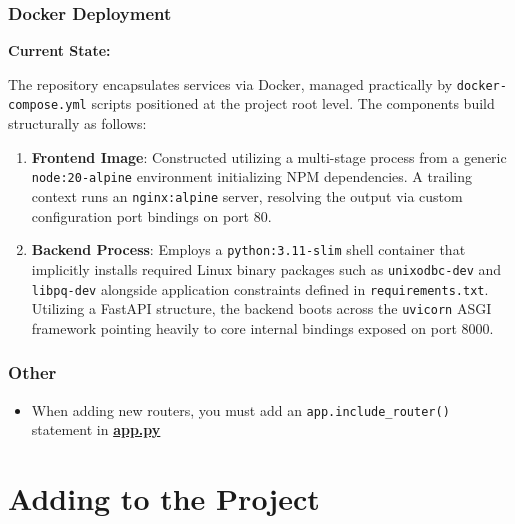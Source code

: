 \documentclass{article}
\begin{document}
\subsubsection{Docker Deployment}

\par{\textbf{Current State:}}
\par{The repository encapsulates services via Docker, managed practically by \texttt{docker-compose.yml} scripts positioned at the project root level. The components build structurally as follows:}

\begin{enumerate}

  \item{\textbf{Frontend Image}: Constructed utilizing a multi-stage process from a generic \texttt{node:20-alpine} environment initializing NPM dependencies. A trailing context runs an \texttt{nginx:alpine} server, resolving the output via custom configuration port bindings on port 80.}
  \item{\textbf{Backend Process}: Employs a \texttt{python:3.11-slim} shell container that implicitly installs required Linux binary packages such as \texttt{unixodbc-dev} and \texttt{libpq-dev} alongside application constraints defined in \texttt{requirements.txt}. Utilizing a FastAPI structure, the backend boots across the \texttt{uvicorn} ASGI framework pointing heavily to core internal bindings exposed on port 8000.}

\end{enumerate}

\subsubsection{Other}

\begin{itemize}
  \item{When adding new routers, you must add an \texttt{app.include\_router()} statement in \href{https://github.com/OCD-Rats-Capstone/OCD-Rat-Infrastructure/blob/main/src/ocd-rat-backend/app.py}{\textbf{app.py}}}
\end{itemize}

\section{Adding to the Project}
\end{document}
